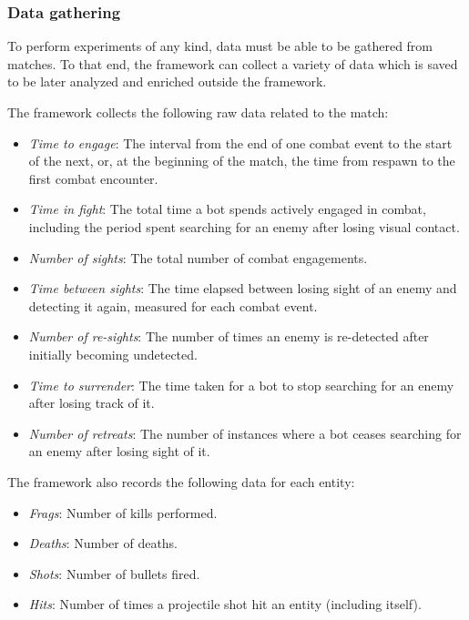 \subsubsection{Data gathering}
\label{subsec:pa_data_gathering}
To perform experiments of any kind, data must be able to be gathered from matches. To that end, the framework can collect a variety of data which is saved to be later analyzed and enriched outside the framework.

The framework collects the following raw data related to the match:

\begin{itemize}
    \item \textit{Time to engage}: The interval from the end of one combat event to the start of the next, or, at the beginning of the match, the time from respawn to the first combat encounter.
    \item \textit{Time in fight}: The total time a bot spends actively engaged in combat, including the period spent searching for an enemy after losing visual contact.
    \item \textit{Number of sights}: The total number of combat engagements.
    \item \textit{Time between sights}: The time elapsed between losing sight of an enemy and detecting it again, measured for each combat event.
    \item \textit{Number of re-sights}: The number of times an enemy is re-detected after initially becoming undetected.
    \item \textit{Time to surrender}: The time taken for a bot to stop searching for an enemy after losing track of it.
    \item \textit{Number of retreats}: The number of instances where a bot ceases searching for an enemy after losing sight of it.
\end{itemize}

The framework also records the following data for each entity:

\begin{itemize}
    \item \textit{Frags}: Number of kills performed. 
    \item \textit{Deaths}: Number of deaths. 
    \item \textit{Shots}: Number of bullets fired. 
    \item \textit{Hits}: Number of times a projectile shot hit an entity (including itself).
\end{itemize}

